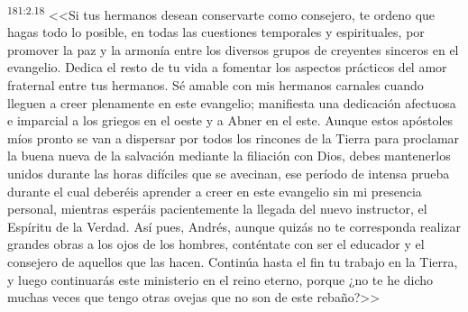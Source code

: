 \par 
\textsuperscript{181:2.18} <<Si tus hermanos desean conservarte como consejero, te ordeno que hagas todo lo posible, en todas las cuestiones temporales y espirituales, por promover la paz y la armonía entre los diversos grupos de creyentes sinceros en el evangelio. Dedica el resto de tu vida a fomentar los aspectos prácticos del amor fraternal entre tus hermanos. Sé amable con mis hermanos carnales cuando lleguen a creer plenamente en este evangelio; manifiesta una dedicación afectuosa e imparcial a los griegos en el oeste y a Abner en el este. Aunque estos apóstoles míos pronto se van a dispersar por todos los rincones de la Tierra para proclamar la buena nueva de la salvación mediante la filiación con Dios, debes mantenerlos unidos durante las horas difíciles que se avecinan, ese período de intensa prueba durante el cual deberéis aprender a creer en este evangelio sin mi presencia personal, mientras esperáis pacientemente la llegada del nuevo instructor, el Espíritu de la Verdad. Así pues, Andrés, aunque quizás no te corresponda realizar grandes obras a los ojos de los hombres, conténtate con ser el educador y el consejero de aquellos que las hacen. Continúa hasta el fin tu trabajo en la Tierra, y luego continuarás este ministerio en el reino eterno, porque ¿no te he dicho muchas veces que tengo otras ovejas que no son de este rebaño?>>

